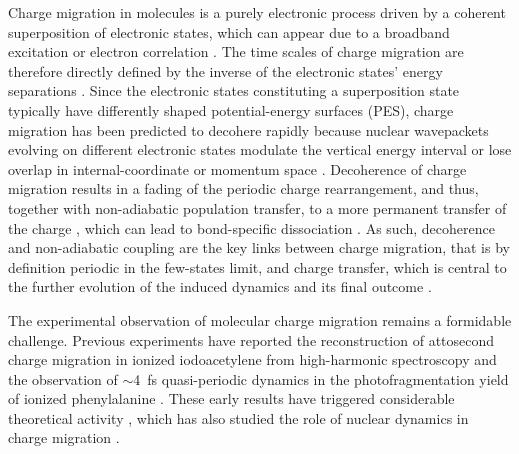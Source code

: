 \documentclass[12pt]{article}
\begin{document}
Charge migration in molecules is a purely electronic process driven by a coherent superposition of electronic states, which can appear due to a broadband excitation \cite{eyring44a,remacle06a} or electron correlation \cite{cederbaum99a,Kuleff14,kraus18a}. The time scales of charge migration are therefore directly defined by the inverse  of the electronic states' energy separations \cite{eyring44a,woerner17a}.
Since the electronic states constituting a superposition state typically have differently shaped potential-energy surfaces (PES), charge migration has been predicted to decohere rapidly because nuclear wavepackets evolving on different electronic states modulate the vertical energy interval or lose overlap in internal-coordinate or momentum space \cite{Vacher15,arnold17a,despre18a,jia19a}. Decoherence of charge migration results in a fading of the periodic charge rearrangement, and thus, together with non-adiabatic population transfer, to a more permanent transfer of the charge \cite{luennemann08a,woerner17a}, which can lead to bond-specific dissociation \cite{remacle98a,lehr05a}. As such, decoherence and non-adiabatic coupling are the key links between charge migration, that is by definition periodic in the few-states limit, and charge transfer, which is central to the further evolution of the induced dynamics and its final outcome \cite{Vacher15,arnold17a,despre18a,jia19a}.

The experimental observation of molecular charge migration remains a formidable challenge. Previous experiments have reported the reconstruction of attosecond charge migration in ionized iodoacetylene from high-harmonic spectroscopy \cite{kraus15b} and the observation of $\sim$4~fs quasi-periodic dynamics in the photofragmentation yield of ionized phenylalanine \cite{calegari14a}. These early results have triggered considerable theoretical activity \cite{Despre15,Kai-Jun17,Jia17}, which has also studied the role of nuclear dynamics in charge migration \cite{vacher14a,Lara-Astiaso17,Sun17,vacher2017,despre18a}. 
\end{document}
